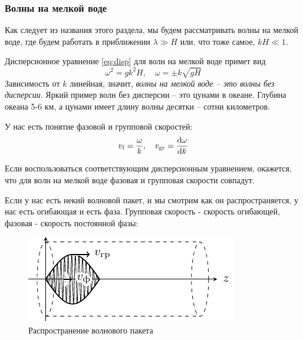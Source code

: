 \subsubsection{Волны на мелкой воде}
Как следует из названия этого раздела, мы будем рассматривать волны на мелкой воде, где будем работать в приближении $\lambda \gg H$ или, что тоже самое,  $kH\ll 1$.

Дисперсионное уравнение \eqref{eq:disp} для волн на мелкой воде примет вид
\begin{equation}
	\omega^2=gk^2H, \quad \omega=\pm k\sqrt{gH}
\end{equation}
Зависимость от $k$ линейная, значит, \textit{волны на мелкой воде -- это волны без дисперсии}. Яркий пример волн без дисперсии -- это цунами в океане. Глубина океана 5-6 км, а цунами имеет длину волны десятки -- сотни километров.



У нас есть понятие фазовой и групповой скоростей:
\begin{equation}
	v_\text{f}=\frac{\omega}{k}, \quad
	v_\text{gr}=\dv{\omega}{k}
\end{equation}

Если воспользоваться соответствующим дисперсионным уравнением, окажется, что для волн на мелкой воде фазовая и групповая скорости совпадут.

Если у нас есть некий волновой пакет, и мы смотрим как он распространяется, у нас есть огибающая и есть фаза. Групповая скорость - скорость огибающей, фазовая - скорость постоянной фазы:
\begin{figure}[H]
    \centering
    \includegraphics[scale=1.5]{photo/wavelet.pdf}
    \caption{Распространение волнового пакета}
    \label{fig:wavelet}
\end{figure}





